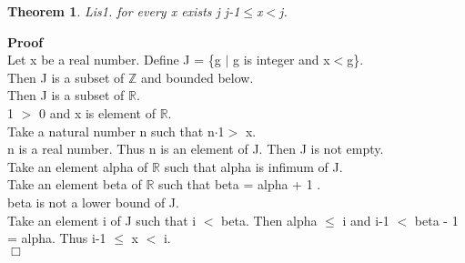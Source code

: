 \documentclass{article}
\newenvironment{forthel}{\begin{leftbar}}{\end{leftbar}}
\newenvironment{proof}{\noindent\textbf{Proof\ }}{\hspace*{\fill}$\Box$\medskip}
\newtheorem{theorem}{Theorem}
\begin{document}
\begin{forthel}
\begin{theorem}
 Lis1. for every x exists j j-1$\leq$x$<$j.
\end{theorem}\begin{proof}\\
Let x be a real number.
Define J = \{g $|$ g is integer and x$<$g\}.\\
Then J is a subset of $\mathbb{Z}$ and bounded below.\\
Then J is a subset of $\mathbb{R}$.\\
1 $>$ 0 and x is element of $\mathbb{R}$.\\
Take a natural number n such that n$\cdot$1$>$ x.\\
n is a real number. Thus n is an element of J. Then J is not empty.\\
Take an element alpha of $\mathbb{R}$ such that alpha is infimum of J.\\
Take an element beta of $\mathbb{R}$ such that beta = alpha + 1 .\\
beta is not a lower bound of J.\\
Take an element i of J such that i $<$ beta. Then  alpha $\leq$ i and i-1 $<$ beta - 1 = alpha. Thus i-1 $\leq$ x $<$ i.\\

\end{proof}














\end{forthel}
\end{document}
